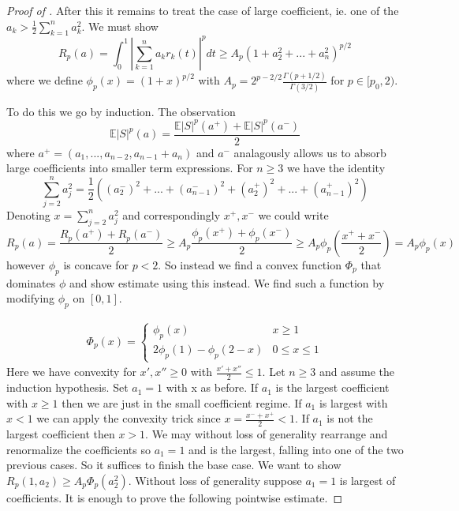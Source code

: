 \documentclass[10pt]{article}
\newcommand{\E}{\mathbb{E}}
\newcommand{\1}{\textbf{1}}
\theoremstyle{remark}
\theoremstyle{definition}
\begin{document}
\begin{proof}[Proof of \cite{NP}]
	After this it remains to treat the case of large coefficient, ie. one of the $a_k > \frac{1}{2}\sum_{k=1}^na_k^2$. We must show
	\begin{equation*}
		R_p(a) = \int_0^1|\sum_{k=1}^n a_kr_k(t)|^p dt \geq A_p(1+a_2^2+...+a_n^2)^{p/2}
	\end{equation*}
	where we define $\phi_p(x) = (1+x)^ {p/2}$ with $A_p = 2^{p-2/2}\frac{\Gamma(p+1/2)}{\Gamma(3/2)}$ for $p \in [p_0,2)$. 

	To do this we go by induction. The observation
	\begin{equation*}
		\E|S|^p(a) = \frac{\E|S|^p(a^+) + \E|S|^p(a^-)}{2}
	\end{equation*} where $a^+ = (a_1,...,a_{n-2},a_{n-1}+a_n)$ and $a^-$ analagously allows us to absorb large coefficients into smaller term expressions. For $n \geq 3$ we have the identity
	\begin{equation*}
		\sum_{j=2}^n a_j^2 = \frac{1}{2}((a_2^-)^2 + ... +(a_{n-1}^-)^2 + (a_2^+)^2 + ... + (a_{n-1}^+)^2)
	\end{equation*} Denoting $x = \sum_{j=2}^n a_j^2$ and correspondingly $x^+,x^-$ we could write
	\begin{equation*}
		R_p(a) = \frac{R_p(a^+)+R_p(a^-)}{2} \geq A_p \frac{\phi_p(x^+)+\phi_p(x^-)}{2} \geq A_p \phi_p(\frac{x^++x^-}{2}) = A_p \phi_p(x)
	\end{equation*} however $\phi_p$ is concave for $p < 2$. So instead we find a convex function $\Phi_p$ that dominates $\phi$ and show estimate using this instead. We find such a function by modifying $\phi_p$ on $[0,1]$.

	\begin{align*}
		\Phi_p(x) = 
		\begin{cases}
			\phi_p(x) & x \geq 1\\
			2 \phi_p(1) - \phi_p(2-x) & 0 \leq x \leq 1
		\end{cases}
	\end{align*} Here we have convexity for $x',x'' \geq 0$ with $\frac{x'+x''}{2} \leq 1$. Let $n \geq 3$ and assume the induction hypothesis. Set $a_1 = 1$ with x as before. If $a_1$ is the largest coefficient with $x \geq 1$ then we are just in the small coefficient regime. If $a_1$ is largest with $x < 1$ we can apply the convexity trick since $x = \frac{x^-+x^+}{2} < 1$. If $a_1$ is not the largest coefficient then $x > 1$. We may without loss of generality rearrange and renormalize the coefficients so $a_1 =1$ and is the largest, falling into one of the two previous cases. So it suffices to finish the base case. We want to show $R_p(1,a_2) \geq A_p \Phi_p(a_2^2)$. Without loss of generality suppose $a_1 =1$ is largest of coefficients. It is enough to prove the following pointwise estimate.


\end{proof}
\end{document}
